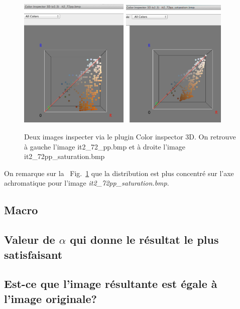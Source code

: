 \documentclass[a4paper,10pt]{article}
\begin{document}
\begin{figure}[ht]
\begin{center}
	\includegraphics[width=5.25cm]{images/it2_72pp}
	\includegraphics[width=5cm]{images/it2_72pp_saturation}
\end{center}
	\caption{Deux images inspecter via le plugin Color inspector 3D. On retrouve \`a gauche l'image it2\_72\_pp.bmp et \`a droite l'image it2\_72pp\_saturation.bmp}
	\label{img3}
\end{figure}

On remarque sur la ~Fig.~\ref{img3} que la distribution est plus concentr\'e sur l'axe achromatique pour l'image \emph{it2\_72pp\_saturation.bmp}.

\subsection{Macro}

\subsection{Valeur de $\alpha$ qui donne le r\'esultat le plus satisfaisant}

\subsection{Est-ce que l'image r\'esultante est \'egale \`a l'image originale?}
\end{document}
